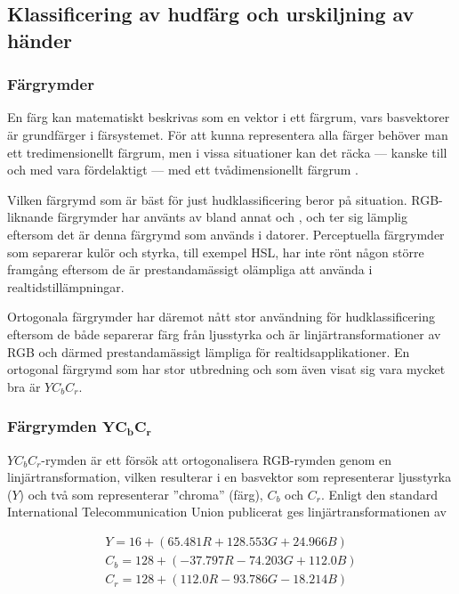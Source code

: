 \documentclass[../rapport_MVEX01-11-05]{subfiles}
\begin{document}
\subsection{Klassificering av hudfärg och urskiljning av händer}\label{sec:hudklassificering}

\subsubsection{Färgrymder}

En färg kan matematiskt beskrivas som en vektor i ett färgrum, vars
basvektorer är grundfärger i färsystemet. För att kunna representera alla färger
behöver man ett tredimensionellt färgrum, men i vissa situationer kan
det räcka --- kanske till och med vara fördelaktigt --- med ett
tvådimensionellt färgrum \cite{Kakumanu07}.

Vilken färgrymd som är bäst för just hudklassificering beror på
situation. RGB-liknande färgrymder har använts av bland annat
 och , och ter sig lämplig
eftersom det är denna färgrymd som används i datorer. Perceptuella
färgrymder som separerar kulör och styrka, till exempel HSL, har inte
rönt någon större framgång eftersom de är prestandamässigt olämpliga
att använda i realtidstillämpningar.

Ortogonala färgrymder har däremot nått stor användning för
hudklassificering \cite{Hsu02,Elmezain08,Hassanpour08} eftersom de
både separerar färg från ljusstyrka och är linjärtransformationer av
RGB och därmed prestandamässigt lämpliga för realtidsapplikationer.
En ortogonal färgrymd som har stor utbredning och som även visat
sig vara mycket bra \cite{Kakumanu07} är $YC_bC_r$.

\subsubsection[Färgrymden $\mathrm{YC_bC_r}$]{Färgrymden $\mathbf{YC_bC_r}$}

$YC_bC_r$-rymden är ett försök att ortogonalisera RGB-rymden genom en
linjärtransformation, vilken resulterar i en basvektor som
representerar ljusstyrka ($Y$) och två som representerar ''chroma''
(färg), $C_b$ och $C_r$. Enligt den standard International
Telecommunication Union publicerat \cite{ITU-BT601} ges
linjärtransformationen av

\begin{equation*}
  \label{eq:farg:ycbcr}
  \begin{gathered}
  Y   = 16  + ( 65.481R + 128.553G + 24.966B)\\
  C_b = 128 + (-37.797R - 74.203G  + 112.0B )\\
  C_r = 128 + (112.0R   - 93.786G  - 18.214B)
  \end{gathered}
\end{equation*}
\end{document}
